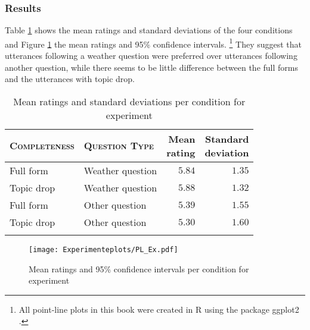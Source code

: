 \subsubsection{Results}\label{sec:exp.ex.results}
Table \ref{tab:descriptives.ex} shows the mean ratings and standard deviations of the four conditions and Figure \ref{fig:pl.ex} the mean ratings and 95\% confidence intervals.%
\footnote{All point-line plots in this book were created in R \citep{rcoreteam2021} using the package ggplot2 \citep{wickham2016}.}
%
They suggest that utterances following a weather question were preferred over utterances following another question, while there seems to be little difference between the full forms and the utterances with topic drop.

\begin{table}
\caption{Mean ratings and standard deviations per condition for experiment }
\centering
\begin{tabular}{llrr}
\lsptoprule
\textsc{Completeness} & \textsc{Question Type} & \Centerstack{Mean\\rating} & \Centerstack{Standard\\deviation} \\
\midrule
Full form & Weather question & $5.84$ & $1.35$ \\
Topic drop & Weather question & $5.88$ & $1.32$\\
Full form & Other question & $5.39$ & $1.55$ \\
Topic drop & Other question & $5.30$ & $1.60$ \\
\lspbottomrule
\end{tabular}
\label{tab:descriptives.ex}
\end{table}

\begin{figure}
\centering
\texttt{[image: Experimenteplots/PL\_Ex.pdf]}
 \caption{Mean ratings and 95\% confidence intervals per condition for experiment }
\label{fig:pl.ex}
\end{figure}

